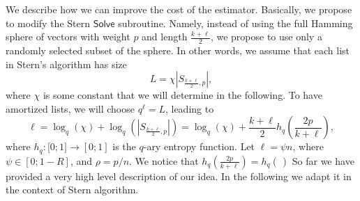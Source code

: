 We describe how we can improve the cost of the estimator.
Basically, we propose to modify the Stern $\mathsf{Solve}$ subroutine.
Namely, instead of using the full Hamming sphere of vectors with weight $p$ and length $\frac{k+\ell}{2}$, we propose to use only a randomly selected subset of the sphere.
In other words, we assume that each list in Stern's algorithm has size
$$L = \chi |S_{\frac{k+\ell}{2}, p}|,$$
where $\chi$ is some constant that we will determine in the following.
To have amortized lists, we will choose $q^\ell = L$, leading to
$$\ell = \log_q(\chi)+\log_q(|S_{\frac{k+\ell}{2},p}|) = \log_q(\chi)+\frac{k+\ell}{2}h_q\left(\frac{2p}{k+\ell}\right),$$
where $h_q:\mathbb [0 ; 1]\rightarrow [0 ; 1]$ is the $q$-ary entropy function.
Let $\ell = \psi n$, where $\psi \in [0 ; 1-R]$, and $\rho = p/n$.
We notice that 
$h_q\left(\frac{2p}{k+\ell}\right) = h_q\left(\frac{}{}\right)$
So far we have provided a very high level description of our idea. In the following we adapt it in the context of Stern algorithm.

